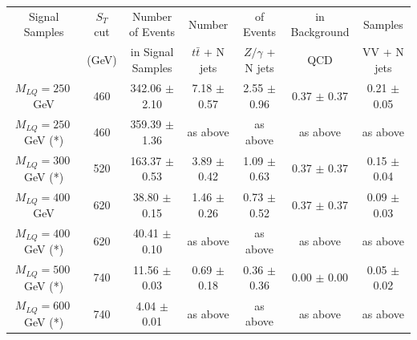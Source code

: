 \begin{table}[htbp]
\begin{center}
\begin{tabular}{|ccc||cccc|}
\hline\hline
Signal Samples       & $S_T$ cut       & Number of Events     & Number              & of Events           & in Background    & Samples     \\
                     & (GeV)           & in Signal Samples     & $t\bar{t}$ + N jets & $Z/\gamma$ + N jets & QCD              & VV + N jets \\ 
\hline
$M_{LQ}=250~$GeV     & 460             & 342.06 $\pm$ 2.10    & 7.18  $\pm$ 0.57    & 2.55  $\pm$ 0.96    & 0.37 $\pm$ 0.37  & 0.21 $\pm$ 0.05 \\ 
$M_{LQ}=250~$GeV (*) & 460             & 359.39 $\pm$ 1.36    & as above            & as above            & as above         & as above        \\
$M_{LQ}=300~$GeV (*) & 520             & 163.37 $\pm$ 0.53    & 3.89  $\pm$ 0.42    & 1.09  $\pm$ 0.63    & 0.37 $\pm$ 0.37  & 0.15 $\pm$ 0.04 \\ 
$M_{LQ}=400~$GeV     & 620             &  38.80 $\pm$ 0.15    & 1.46  $\pm$ 0.26    & 0.73  $\pm$ 0.52    & 0.37 $\pm$ 0.37  & 0.09 $\pm$ 0.03 \\ 
$M_{LQ}=400~$GeV (*) & 620             &  40.41 $\pm$ 0.10    & as above            & as above            & as above         & as above        \\
$M_{LQ}=500~$GeV (*) & 740             &  11.56 $\pm$ 0.03    & 0.69  $\pm$ 0.18    & 0.36  $\pm$ 0.36    & 0.00 $\pm$ 0.00  & 0.05 $\pm$ 0.02 \\ 
$M_{LQ}=600~$GeV (*) & 740             &   4.04 $\pm$ 0.01    & as above            & as above            & as above         & as above        \\

\end{tabular}
\end{center}
\end{table}

